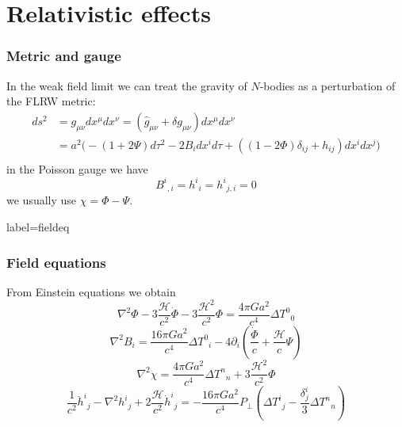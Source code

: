 \documentclass{beamer}
\makeatletter
\newcommand{\mylabel}{%
}
\newcommand{\Hconf}{\mathcal{H}}
\makeatother
\begin{document}
\section{Relativistic effects}
\frame{\sectionpage}


\begin{frame}[label=metric]
    \frametitle{Metric and gauge\mylabel}
   \newcommand{\qq}{p^2+m^2 a^2}
    In the weak field limit we can treat the gravity of $N$-bodies 
    as a perturbation of the FLRW metric:
    \begin{equation}
    \begin{split}
        ds^2
        &= g_{\mu\nu} dx^{\mu}dx^{\nu} = (\hat g_{\mu\nu} + \delta
        g_{\mu\nu})dx^{\mu} dx^{\nu} \\
        &= a^2 \big( 
            - (1+2\Psi)d\tau^2
            - 2 B_i dx^i d\tau
             + ((1-2\Phi) \delta_{ij}+ h_{ij}) dx^i dx^j \big) \\
    \end{split}
    \end{equation}
    in the Poisson gauge we have
    \[
        B^i{}_{,i} =  h^{i}{}_i =  h^i{}_{j,i} = 0
    \]
    we usually use $\chi=\Phi-\Psi$.
\end{frame}

\begin{frame}{label=fieldeq}
    \frametitle{Field equations}%
    From Einstein equations we obtain
    \begin{equation}
        \nabla^2 \Phi 
        - 3\frac{\Hconf}{c^2} \dot\Phi -
        3\frac{\Hconf^2}{c^2} \Phi
        = \frac{4\pi G a^2}{c^4} \Delta T^0{}_0
    \end{equation}
    \begin{equation}
        \nabla^2 B_i
        = \frac{16\pi G a^2}{c^4} \Delta T^0{}_i - 4\partial_i(
        \frac{\dot\Phi}{c} +
        \frac{\Hconf}{c} \Psi  )
    \end{equation}
    \begin{equation}
        \nabla^2 \chi
        = \frac{4\pi G a^2}{c^4} \Delta T^n{}_n + 3 \frac{\Hconf^2}{c^2} \Phi
    \end{equation}
    \begin{equation}
        \frac{1}{c^2} \ddot h^i{}_j- \nabla^2 h^i{}_j + 2 \frac{\Hconf}{c^2} {\dot h}^i{}_j
        = - \frac{16\pi G a^2}{c^4} P_{\perp}\left( \Delta T^i{}_j -
	\frac{\delta^i_j}{3} \Delta T^n{}_n\right)
    \end{equation}
\end{frame}
\end{document}
